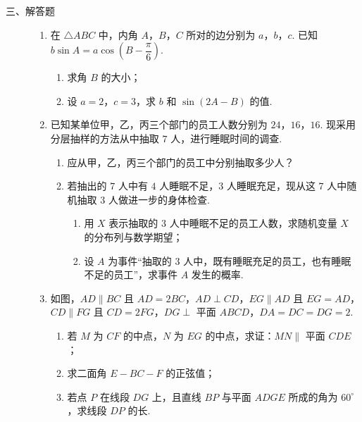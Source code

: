 \begin{description}

    \item[三、解答题]

    \begin{enumerate}[leftmargin=5pt]

      \addtocounter{enumi}{+14}

        \item 在 \(\triangle ABC\) 中，内角 \(A\)，\(B\)，\(C\) 所对的边分别为 \(a\)，\(b\)，\(c\). 已知 \(b\sin A=a\cos\left(B-\dfrac{\pi}{6}\right)\).

\begin{enumerate}
\item 求角 \(B\) 的大小；
\item 设 \(a=2\)，\(c=3\)，求 \(b\) 和 \(\sin(2A-B)\) 的值.
\end{enumerate}

        \item 已知某单位甲，乙，丙三个部门的员工人数分别为 \(24\)，\(16\)，\(16\). 现采用分层抽样的方法从中抽取 \(7\) 人，进行睡眠时间的调查.

\begin{enumerate}
\item 应从甲，乙，丙三个部门的员工中分别抽取多少人？
\item 若抽出的 \(7\) 人中有 \(4\) 人睡眠不足，\(3\) 人睡眠充足，现从这 \(7\) 人中随机抽取 \(3\) 人做进一步的身体检查.
\begin{enumerate}
\item 用 \(X\) 表示抽取的 \(3\) 人中睡眠不足的员工人数，求随机变量 \(X\) 的分布列与数学期望；
\item 设 \(A\) 为事件“抽取的 \(3\) 人中，既有睡眠充足的员工，也有睡眠不足的员工”，求事件 \(A\) 发生的概率.
\end{enumerate}
\end{enumerate}

        \item 如图，\(AD\parallel BC\) 且 \(AD=2BC\)，\(AD\perp CD\)，\(EG\parallel AD\) 且 \(EG=AD\)，\(CD\parallel FG\) 且 \(CD=2FG\)，\(DG\perp\) 平面 \(ABCD\)，\(DA=DC=DG=2\).

\begin{enumerate}
\item 若 \(M\) 为 \(CF\) 的中点，\(N\) 为 \(EG\) 的中点，求证：\(MN\parallel\) 平面 \(CDE\)；
\item 求二面角 \(E-BC-F\) 的正弦值；
\item 若点 \(P\) 在线段 \(DG\) 上，且直线 \(BP\) 与平面 \(ADGE\) 所成的角为 \(60^\circ\)，求线段 \(DP\) 的长.
\end{enumerate}


\end{enumerate}
\end{description}
